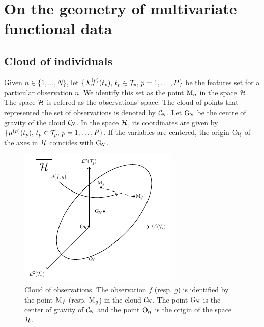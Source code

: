 \section{On the geometry of multivariate functional data} %
\label{sec:geometric_point_of_view_mfpca}

\subsection{Cloud of individuals} %
\label{sub:cloud_of_individuals}

Given $n \in \{1, \dots, N\}$, let $\{X_n^{(p)}(t_p),\,t_p \in \mathcal{T}_{p},\,p = 1, \dots, P\}$ be the features set for a particular observation $n$. We identify this set as the point $\mathrm{M}_n$ in the space $\mathcal{H}$. The space $\mathcal{H}$ is refered as the observations' space. The cloud of points that represented the set of observations is denoted by $\mathcal{C}_{\!N}$. Let $\mathrm{G}_{\!N}$ be the centre of gravity of the cloud $\mathcal{C}_{\!N}$. In the space $\mathcal{H}$, its coordinates are given by $\{\mu^{(p)}(t_p),\,t_p \in \mathcal{T}_{p},\,p = 1, \dots, P\}$. If the variables are centered, the origin $\mathrm{O}_{\!\mathcal{H}}$ of the axes in $\mathcal{H}$ coincides with $\mathrm{G}_{\!N}$.

\begin{figure}
    \centering
    \includegraphics[scale=1.2]{figures/cloud_obs.pdf}
    \caption{Cloud of observations. The observation $f$ (resp. $g$) is identified by the point $\mathrm{M}_f$ (resp. $\mathrm{M}_g$) in the cloud $\mathcal{C}_{\!N}$. The point $\mathrm{G}_{\!N}$ is the center of gravity of $\mathcal{C}_{\!N}$ and the point $\mathrm{O}_{\!\mathcal{H}}$ is the origin of the space $\mathcal{H}$.}
    \label{fig:cloud_obs}
\end{figure}

